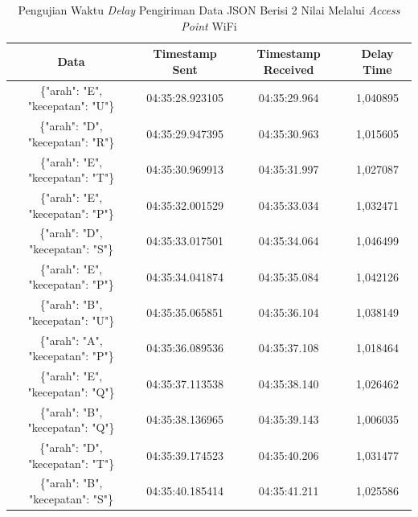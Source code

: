 \begin{table}[htpb]
  \centering
  \caption{Pengujian Waktu \emph{Delay} Pengiriman Data JSON Berisi 2 Nilai Melalui \emph{Access Point} WiFi}
  \label{tbl:delayWiFiJSON}
  \begin{tabular}{|ccc|c|}
  \hline
  \multicolumn{1}{|c|}{Data}                              & \multicolumn{1}{c|}{Timestamp Sent}  & Timestamp Received & Delay Time  \\ \hline
  \multicolumn{1}{|c|}{\{"arah": "E", "kecepatan": "U"\}} & \multicolumn{1}{c|}{04:35:28.923105} & 04:35:29.964       & 1,040895    \\ \hline
  \multicolumn{1}{|c|}{\{"arah": "D", "kecepatan": "R"\}} & \multicolumn{1}{c|}{04:35:29.947395} & 04:35:30.963       & 1,015605    \\ \hline
  \multicolumn{1}{|c|}{\{"arah": "E", "kecepatan": "T"\}} & \multicolumn{1}{c|}{04:35:30.969913} & 04:35:31.997       & 1,027087    \\ \hline
  \multicolumn{1}{|c|}{\{"arah": "E", "kecepatan": "P"\}} & \multicolumn{1}{c|}{04:35:32.001529} & 04:35:33.034       & 1,032471    \\ \hline
  \multicolumn{1}{|c|}{\{"arah": "D", "kecepatan": "S"\}} & \multicolumn{1}{c|}{04:35:33.017501} & 04:35:34.064       & 1,046499    \\ \hline
  \multicolumn{1}{|c|}{\{"arah": "E", "kecepatan": "P"\}} & \multicolumn{1}{c|}{04:35:34.041874} & 04:35:35.084       & 1,042126    \\ \hline
  \multicolumn{1}{|c|}{\{"arah": "B", "kecepatan": "U"\}} & \multicolumn{1}{c|}{04:35:35.065851} & 04:35:36.104       & 1,038149    \\ \hline
  \multicolumn{1}{|c|}{\{"arah": "A", "kecepatan": "P"\}} & \multicolumn{1}{c|}{04:35:36.089536} & 04:35:37.108       & 1,018464    \\ \hline
  \multicolumn{1}{|c|}{\{"arah": "E", "kecepatan": "Q"\}} & \multicolumn{1}{c|}{04:35:37.113538} & 04:35:38.140       & 1,026462    \\ \hline
  \multicolumn{1}{|c|}{\{"arah": "B", "kecepatan": "Q"\}} & \multicolumn{1}{c|}{04:35:38.136965} & 04:35:39.143       & 1,006035    \\ \hline
  \multicolumn{1}{|c|}{\{"arah": "D", "kecepatan": "T"\}} & \multicolumn{1}{c|}{04:35:39.174523} & 04:35:40.206       & 1,031477    \\ \hline
  \multicolumn{1}{|c|}{\{"arah": "B", "kecepatan": "S"\}} & \multicolumn{1}{c|}{04:35:40.185414} & 04:35:41.211       & 1,025586    \\ \hline

\end{tabular}
\end{table}
